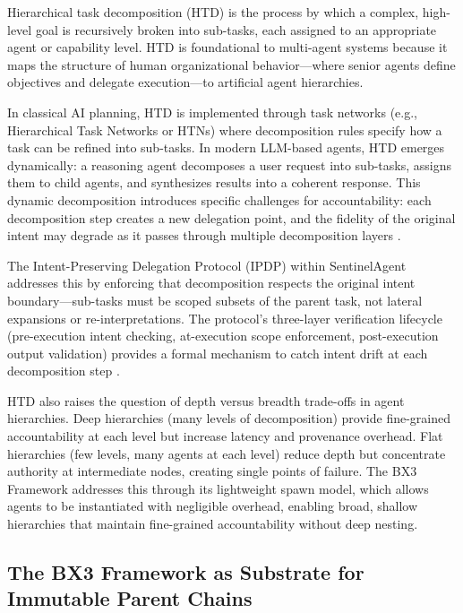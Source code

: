 Hierarchical task decomposition (HTD) is the process by which a complex, high-level goal is recursively broken into sub-tasks, each assigned to an appropriate agent or capability level. HTD is foundational to multi-agent systems because it maps the structure of human organizational behavior—where senior agents define objectives and delegate execution—to artificial agent hierarchies.

In classical AI planning, HTD is implemented through task networks (e.g., Hierarchical Task Networks or HTNs) where decomposition rules specify how a task can be refined into sub-tasks. In modern LLM-based agents, HTD emerges dynamically: a reasoning agent decomposes a user request into sub-tasks, assigns them to child agents, and synthesizes results into a coherent response. This dynamic decomposition introduces specific challenges for accountability: each decomposition step creates a new delegation point, and the fidelity of the original intent may degrade as it passes through multiple decomposition layers \cite{SentinelAgent:2026}.

The Intent-Preserving Delegation Protocol (IPDP) within SentinelAgent addresses this by enforcing that decomposition respects the original intent boundary—sub-tasks must be scoped subsets of the parent task, not lateral expansions or re-interpretations. The protocol's three-layer verification lifecycle (pre-execution intent checking, at-execution scope enforcement, post-execution output validation) provides a formal mechanism to catch intent drift at each decomposition step \cite{SentinelAgent:2026}.

HTD also raises the question of depth versus breadth trade-offs in agent hierarchies. Deep hierarchies (many levels of decomposition) provide fine-grained accountability at each level but increase latency and provenance overhead. Flat hierarchies (few levels, many agents at each level) reduce depth but concentrate authority at intermediate nodes, creating single points of failure. The BX3 Framework addresses this through its lightweight spawn model, which allows agents to be instantiated with negligible overhead, enabling broad, shallow hierarchies that maintain fine-grained accountability without deep nesting.


\subsection{The BX3 Framework as Substrate for Immutable Parent Chains}

